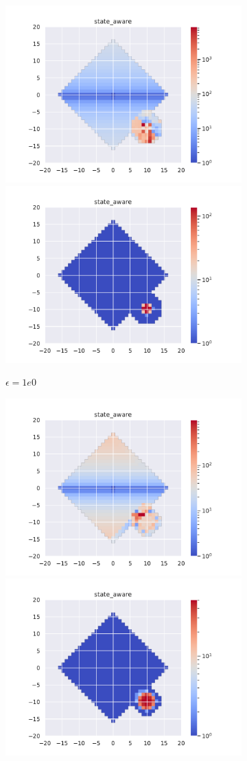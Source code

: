 \documentclass[runningheads]{llncs}
\begin{document}
\begin{figure}[H]
	\ContinuedFloat
	\centering
	\begin{subfigure}[b]{\linewidth}
		\centering
		\includegraphics[width=0.49\linewidth]{img/epsilon/1e0/updates_state_aware.pdf}
		\includegraphics[width=0.49\linewidth]{img/epsilon/1e0/occupations_state_aware.pdf}
		\caption{$\epsilon=1e0$}
	\end{subfigure}
	\begin{subfigure}[b]{\linewidth}
		\centering
		\includegraphics[width=0.49\linewidth]{img/epsilon/1e1/updates_state_aware.pdf}
		\includegraphics[width=0.49\linewidth]{img/epsilon/1e1/occupations_state_aware.pdf}

\end{subfigure}
\end{figure}
\end{document}
